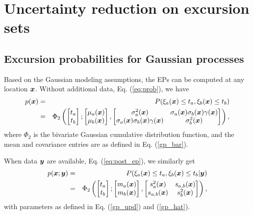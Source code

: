 \documentclass[aoas]{imsart}
\begin{document}
\section{Uncertainty reduction on excursion sets}
\label{sec:sur}

\subsection{Excursion probabilities for Gaussian processes}

Based on the Gaussian modeling assumptions, the EPs can be computed at any location ${\boldsymbol x}$. Without
additional data, Eq.
(\ref{eq:prob}), we have
\begin{eqnarray}\label{eq:prob_mv0}
 p(\bx) &=& P(\xi_a(\bx) \leq t_a, \xi_b(\bx) \leq t_b) \nonumber \\
 &=& \Phi_2 \begin{pmatrix} 
\begin{bmatrix} t_a\\
t_b
\end{bmatrix};
\begin{bmatrix} \mu_{a}(\bx)\\
\mu_{b}(\bx)
\end{bmatrix},\begin{bmatrix}
\sigma_{a}^2(\bx) & \sigma_{a}(\bx)\sigma_{b}(\bx) \gamma(\bx)  \\
\sigma_{a}(\bx)\sigma_{b}(\bx) \gamma(\bx)  & \sigma_{b}^2(\bx)  
\end{bmatrix}\end{pmatrix},
\end{eqnarray}
where $\Phi_2$ is the bivariate Gaussian cumulative distribution
function, and the mean and covariance entries are as defined in Eq. (\ref{gp_bar}).

When data ${\boldsymbol y}$ are available, Eq. (\ref{eq:post_ep}), we similarly get
\begin{eqnarray}\label{eq:prob_mv}
 p(\bx;\by) &=& P(\xi_a(\bx) \leq t_a, \xi_b(\bx) \leq t_b |\by)
 \nonumber \\
 &=& \Phi_2 \begin{pmatrix} 
\begin{bmatrix} t_a\\
t_b
\end{bmatrix};
\begin{bmatrix} m_{a}(\bx)\\
m_{b}(\bx)
\end{bmatrix},\begin{bmatrix}
s_{a}^2(\bx) & s_{a,b}(\bx)  \\
s_{a,b}(\bx)  & s_{b}^2(\bx)  
\end{bmatrix}\end{pmatrix},
\end{eqnarray}
with parameters as defined in Eq. (\ref{gp_upd}) and (\ref{gp_hat}).
\end{document}
